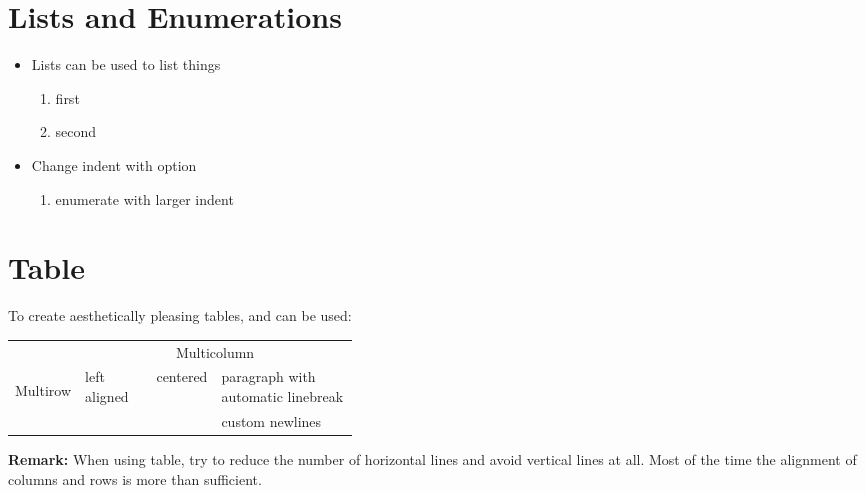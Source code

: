 \documentclass[\fontheight]{extarticle}
\begin{document}
\begin{multicols*}{3}
    \section{Lists and Enumerations}
    \begin{itemize}
        \item Lists can be used to list things
              \begin{enumerate}
                  \item first
                  \item second
              \end{enumerate}
        \item Change indent with option \code{[leftmargin = 40pt]}
              \begin{enumerate}[leftmargin=40pt]
                  \item enumerate with larger indent
              \end{enumerate}
    \end{itemize}

    \section{Table}
    To create aesthetically pleasing tables,  and  can be used:
    \newpar{}
    \renewcommand{\arraystretch}{1.3}
    \setlength\tabcolsep{6pt} %
    \begin{tabularx}{\linewidth}{@{}llcp{0.4\linewidth}@{}}
        \toprule
                                                                & \multicolumn{3}{c}{Multicolumn}                                                                                        \\
        \cmidrule{2-4}
        \multirow{2}{*}{\begin{sideways}Multirow\end{sideways}} & left aligned                    & centered & paragraph with automatic linebreak    \\
        \cmidrule{2-4}
        \morecmidrules\cmidrule{2-4}
        &                                 &          & custom new\newline lines                                                                         \\
        \bottomrule
    \end{tabularx}
    \renewcommand{\arraystretch}{1}
    \setlength\tabcolsep{6pt} %
    \textbf{Remark:} When using table, try to reduce the number of horizontal lines and avoid vertical lines at all.
    Most of the time the alignment of columns and rows is more than sufficient.


\end{multicols*}
\end{document}
